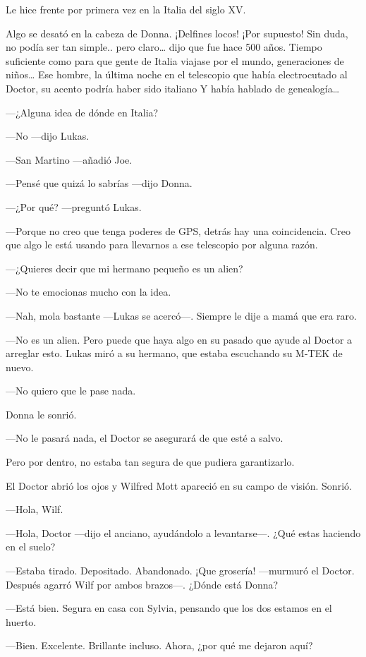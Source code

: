 Le hice frente por primera vez en la Italia del siglo XV.

Algo se desató en la cabeza de Donna. ¡Delfines locos! ¡Por supuesto!
Sin duda, no podía ser tan simple.. pero claro\ldots{} dijo que fue hace
500 años. Tiempo suficiente como para que gente de Italia viajase por el
mundo, generaciones de niños\ldots{} Ese hombre, la última noche en el
telescopio que había electrocutado al Doctor, su acento podría haber
sido italiano Y había hablado de genealogía\ldots{}

---¿Alguna idea de dónde en Italia?

---No ---dijo Lukas.

---San Martino ---añadió Joe.

---Pensé que quizá lo sabrías ---dijo Donna.

---¿Por qué? ---preguntó Lukas.

---Porque no creo que tenga poderes de GPS, detrás hay una coincidencia.
Creo que algo le está usando para llevarnos a ese telescopio por alguna
razón.

---¿Quieres decir que mi hermano pequeño es un alien?

---No te emocionas mucho con la idea.

---Nah, mola bastante ---Lukas se acercó---. Siempre le dije a mamá que
era raro.

---No es un alien. Pero puede que haya algo en su pasado que ayude al
Doctor a arreglar esto. Lukas miró a su hermano, que estaba escuchando
su M-TEK de nuevo.

---No quiero que le pase nada.

Donna le sonrió.

---No le pasará nada, el Doctor se asegurará de que esté a salvo.

Pero por dentro, no estaba tan segura de que pudiera garantizarlo.

El Doctor abrió los ojos y Wilfred Mott apareció en su campo de visión.
Sonrió.

---Hola, Wilf.

---Hola, Doctor ---dijo el anciano, ayudándolo a levantarse---. ¿Qué
estas haciendo en el suelo?

---Estaba tirado. Depositado. Abandonado. ¡Que grosería! ---murmuró el
Doctor. Después agarró Wilf por ambos brazos---. ¿Dónde está Donna?

---Está bien. Segura en casa con Sylvia, pensando que los dos estamos en
el huerto.

---Bien. Excelente. Brillante incluso. Ahora, ¿por qué me dejaron aquí?

